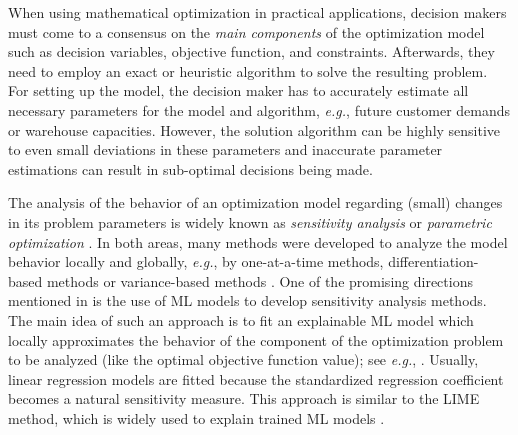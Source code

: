 \documentclass{article}
\theoremstyle{plain}
\theoremstyle{definition}
\theoremstyle{remark}
\begin{document}
When using mathematical optimization in practical applications, decision makers must come to a consensus on the \textit{main components} of the optimization model such as decision variables, objective function, and constraints. Afterwards, they need to employ an exact or heuristic algorithm to solve the resulting problem. For setting up the model, the decision maker has to accurately estimate all necessary parameters for the model and algorithm, \textit{e.g.}, future customer demands or warehouse capacities. However, the solution algorithm can be highly sensitive to even small deviations in these parameters and inaccurate parameter estimations can result in sub-optimal decisions being made. 

The analysis of the behavior of an optimization model regarding (small) changes in its problem parameters is widely known as \textit{sensitivity analysis} \citep{borgonovo_sensitivity_2016} or \textit{parametric optimization} \citep{still2018lectures}. In both areas, many methods were developed to analyze the model behavior locally and globally, \textit{e.g.}, by one-at-a-time methods, differentiation-based methods or variance-based methods \citep{borgonovo_sensitivity_2016,iooss2015review,razavi_future_2021}. One of the promising directions mentioned in \citep{razavi_future_2021} is the use of ML models to develop sensitivity analysis methods. The main idea of such an approach is to fit an explainable ML model which locally approximates the behavior of the component of the optimization problem to be analyzed (like the optimal objective function value); see \textit{e.g.}, \citep{wagner_global_1995}. Usually, linear regression models are fitted because the standardized regression coefficient becomes a natural sensitivity measure. This approach is similar to the LIME method, which is widely used to explain trained ML models \citep{ribeiro_why_2016}.
\end{document}
